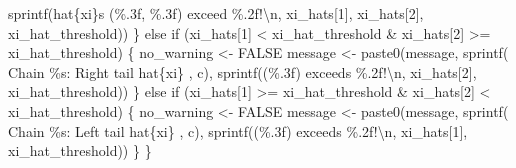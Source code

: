 \documentclass[
  letterpaper,
  DIV=11,
  numbers=noendperiod]{scrartcl}
\newenvironment{Shaded}{\begin{snugshade}}{\end{snugshade}}
\newcommand{\CharTok}[1]{\textcolor[rgb]{0.13,0.47,0.30}{#1}}
\newcommand{\ControlFlowTok}[1]{\textcolor[rgb]{0.00,0.23,0.31}{#1}}
\newcommand{\DecValTok}[1]{\textcolor[rgb]{0.68,0.00,0.00}{#1}}
\newcommand{\NormalTok}[1]{\textcolor[rgb]{0.00,0.23,0.31}{#1}}
\newcommand{\OperatorTok}[1]{\textcolor[rgb]{0.37,0.37,0.37}{#1}}
\newcommand{\SpecialCharTok}[1]{\textcolor[rgb]{0.37,0.37,0.37}{#1}}
\newcommand{\StringTok}[1]{\textcolor[rgb]{0.13,0.47,0.30}{#1}}
\begin{document}
\begin{Shaded}
\begin{Highlighting}[]
\NormalTok{              sprintf(}\StringTok{\textquotesingle{}hat}\SpecialCharTok{\{xi\}}\StringTok{s (}\SpecialCharTok{\%.3f}\StringTok{, }\SpecialCharTok{\%.3f}\StringTok{) exceed }\SpecialCharTok{\%.2f}\StringTok{!}\CharTok{\textbackslash{}n}\StringTok{\textquotesingle{}}\NormalTok{, }
\NormalTok{                      xi\_hats[}\DecValTok{1}\NormalTok{], xi\_hats[}\DecValTok{2}\NormalTok{], xi\_hat\_threshold))}
\NormalTok{    \} }\ControlFlowTok{else} \ControlFlowTok{if}\NormalTok{ (xi\_hats[}\DecValTok{1}\NormalTok{] }\OperatorTok{\textless{}}\NormalTok{ xi\_hat\_threshold }\OperatorTok{\&} 
\NormalTok{               xi\_hats[}\DecValTok{2}\NormalTok{] }\OperatorTok{\textgreater{}=}\NormalTok{ xi\_hat\_threshold) \{}
\NormalTok{      no\_warning }\OperatorTok{\textless{}{-}}\NormalTok{ FALSE}
\NormalTok{      message }\OperatorTok{\textless{}{-}}
\NormalTok{        paste0(message,}
\NormalTok{               sprintf(}\StringTok{\textquotesingle{}  Chain }\SpecialCharTok{\%s}\StringTok{: Right tail hat}\SpecialCharTok{\{xi\}}\StringTok{ \textquotesingle{}}\NormalTok{, c),}
\NormalTok{               sprintf(}\StringTok{\textquotesingle{}(}\SpecialCharTok{\%.3f}\StringTok{) exceeds }\SpecialCharTok{\%.2f}\StringTok{!}\CharTok{\textbackslash{}n}\StringTok{\textquotesingle{}}\NormalTok{,}
\NormalTok{                       xi\_hats[}\DecValTok{2}\NormalTok{], xi\_hat\_threshold))}
\NormalTok{    \} }\ControlFlowTok{else} \ControlFlowTok{if}\NormalTok{ (xi\_hats[}\DecValTok{1}\NormalTok{] }\OperatorTok{\textgreater{}=}\NormalTok{ xi\_hat\_threshold }\OperatorTok{\&} 
\NormalTok{               xi\_hats[}\DecValTok{2}\NormalTok{] }\OperatorTok{\textless{}}\NormalTok{ xi\_hat\_threshold) \{}
\NormalTok{      no\_warning }\OperatorTok{\textless{}{-}}\NormalTok{ FALSE}
\NormalTok{      message }\OperatorTok{\textless{}{-}}
\NormalTok{        paste0(message,}
\NormalTok{               sprintf(}\StringTok{\textquotesingle{}  Chain }\SpecialCharTok{\%s}\StringTok{: Left tail hat}\SpecialCharTok{\{xi\}}\StringTok{ \textquotesingle{}}\NormalTok{, c),}
\NormalTok{               sprintf(}\StringTok{\textquotesingle{}(}\SpecialCharTok{\%.3f}\StringTok{) exceeds }\SpecialCharTok{\%.2f}\StringTok{!}\CharTok{\textbackslash{}n}\StringTok{\textquotesingle{}}\NormalTok{,}
\NormalTok{                       xi\_hats[}\DecValTok{1}\NormalTok{], xi\_hat\_threshold))}
\NormalTok{    \}}
\NormalTok{  \}}
  

\end{Highlighting}
\end{Shaded}
\end{document}
